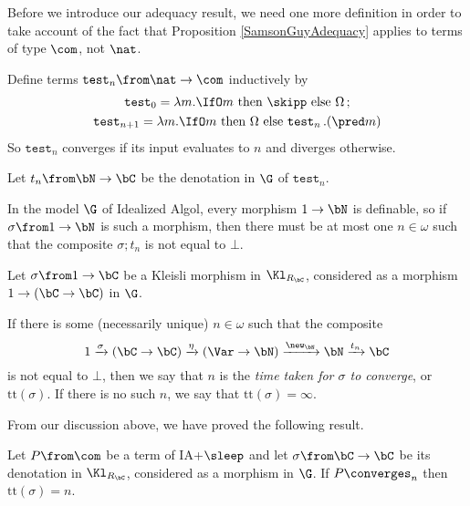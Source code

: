 Before we introduce our adequacy result, we need one more definition in order to take account of the fact that Proposition \ref{SamsonGuyAdequacy} applies to terms of type $\com$, not $\nat$.

\newcommand{\test}{{\mathtt{test}}}
\begin{definition}
  Define terms $\test_n\from\nat\to\com$ inductively by
  \begin{gather*}
    \test_0 = \lambda m.\IfO m\text{ then }\skipp\text{ else }\Omega\,; \\
    \test_{n+1} = \lambda m.\IfO m\text{ then }\Omega\text{ else }\test_n\,. (\pred m)
  \end{gather*}
  So $\test_n$ converges if its input evaluates to $n$ and diverges otherwise.
  
  Let $t_n\from\bN \to \bC$ be the denotation in $\G$ of $\test_n$.
\end{definition}

\begin{remark}
  In the model $\G$ of Idealized Algol, every morphism $1 \to \bN$ is definable, so if $\sigma\from 1 \to \bN$ is such a morphism, then there must be at most one $n\in\omega$ such that the composite $\sigma;t_n$ is not equal to $\bot$.
\end{remark}

\newcommand{\tit}{\mathrm{tt}}
\begin{definition}
  Let $\sigma\from 1 \to \bC$ be a Kleisli morphism in $\Kl_{R_{\bC}}$, considered as a morphism $1 \to (\bC \to \bC)$ in $\G$.  

  If there is some (necessarily unique) $n\in\omega$ such that the composite
  \[
    1 \xrightarrow{\sigma}
    (\bC \to \bC) \xrightarrow{\eta}
    (\Var \to \bN) \xrightarrow{\new_\bN}
    \bN \xrightarrow{t_n}
    \bC
    \]
  is not equal to $\bot$, then we say that $n$ is the \emph{time taken for $\sigma$ to converge}, or $\tit(\sigma)$.
  If there is no such $n$, we say that $\tit(\sigma)=\infty$.
  \label{DefTimeTaken}
\end{definition}

From our discussion above, we have proved the following result.

\begin{proposition}
  Let $P\from \com$ be a term of IA+$\sleep$ and let $\sigma\from \bC \to \bC$ be its denotation in $\Kl_{R_\bC}$, considered as a morphism in $\G$.
  If $P\converges_n$ then $\tit(\sigma)=n$.
  \label{IaSleepSoundness}
\end{proposition}


